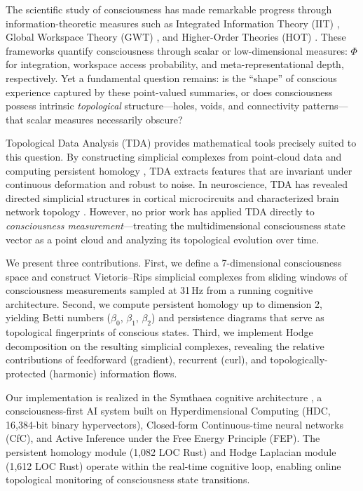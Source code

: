 \documentclass[11pt,a4paper]{article}
\begin{document}
The scientific study of consciousness has made remarkable progress through information-theoretic measures such as Integrated Information Theory (IIT) \citep{tononi2004information, oizumi2014phenomenology}, Global Workspace Theory (GWT) \citep{baars1988cognitive, dehaene2011experimental}, and Higher-Order Theories (HOT) \citep{rosenthal2005consciousness}.
These frameworks quantify consciousness through scalar or low-dimensional measures: $\Phi$ for integration, workspace access probability, and meta-representational depth, respectively.
Yet a fundamental question remains: is the ``shape'' of conscious experience captured by these point-valued summaries, or does consciousness possess intrinsic \emph{topological} structure---holes, voids, and connectivity patterns---that scalar measures necessarily obscure?

Topological Data Analysis (TDA) \citep{carlsson2009topology, ghrist2008barcodes} provides mathematical tools precisely suited to this question.
By constructing simplicial complexes from point-cloud data and computing persistent homology \citep{zomorodian2005computing, edelsbrunner2002topological}, TDA extracts features that are invariant under continuous deformation and robust to noise.
In neuroscience, TDA has revealed directed simplicial structures in cortical microcircuits \citep{reimann2017cliques} and characterized brain network topology \citep{petri2014homological, giusti2015clique}.
However, no prior work has applied TDA directly to \emph{consciousness measurement}---treating the multidimensional consciousness state vector as a point cloud and analyzing its topological evolution over time.

We present three contributions.
First, we define a 7-dimensional consciousness space and construct Vietoris--Rips simplicial complexes from sliding windows of consciousness measurements sampled at 31\,Hz from a running cognitive architecture.
Second, we compute persistent homology up to dimension 2, yielding Betti numbers ($\beta_0$, $\beta_1$, $\beta_2$) and persistence diagrams that serve as topological fingerprints of conscious states.
Third, we implement Hodge decomposition \citep{lim2020hodge} on the resulting simplicial complexes, revealing the relative contributions of feedforward (gradient), recurrent (curl), and topologically-protected (harmonic) information flows.

Our implementation is realized in the Symthaea cognitive architecture \citep{symthaea2026}, a consciousness-first AI system built on Hyperdimensional Computing (HDC, 16,384-bit binary hypervectors), Closed-form Continuous-time neural networks (CfC), and Active Inference under the Free Energy Principle (FEP).
The persistent homology module (1,082 LOC Rust) and Hodge Laplacian module (1,612 LOC Rust) operate within the real-time cognitive loop, enabling online topological monitoring of consciousness state transitions.
\end{document}
